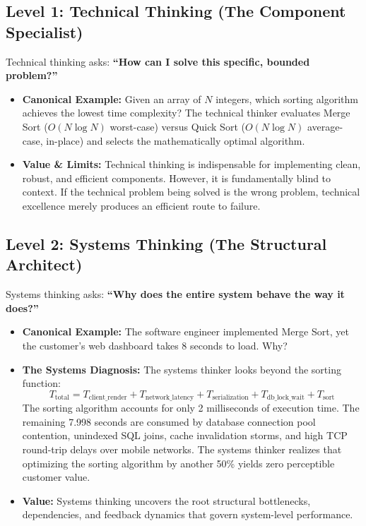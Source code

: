\subsection{Level 1: Technical Thinking (The Component Specialist)}
Technical thinking asks: \textbf{``How can I solve this specific, bounded problem?''}
\begin{itemize}[leftmargin=1.5em]
    \item \textbf{Canonical Example:} Given an array of $N$ integers, which sorting algorithm achieves the lowest time complexity? The technical thinker evaluates Merge Sort ($O(N \log N)$ worst-case) versus Quick Sort ($O(N \log N)$ average-case, in-place) and selects the mathematically optimal algorithm.
    \item \textbf{Value \& Limits:} Technical thinking is indispensable for implementing clean, robust, and efficient components. However, it is fundamentally blind to context. If the technical problem being solved is the wrong problem, technical excellence merely produces an efficient route to failure.
\end{itemize}

\subsection{Level 2: Systems Thinking (The Structural Architect)}
Systems thinking asks: \textbf{``Why does the entire system behave the way it does?''}
\begin{itemize}[leftmargin=1.5em]
    \item \textbf{Canonical Example:} The software engineer implemented Merge Sort, yet the customer's web dashboard takes 8 seconds to load. Why?
    \item \textbf{The Systems Diagnosis:} The systems thinker looks beyond the sorting function:
    \begin{equation}
        T_{\text{total}} = T_{\text{client\_render}} + T_{\text{network\_latency}} + T_{\text{serialization}} + T_{\text{db\_lock\_wait}} + T_{\text{sort}}
    \end{equation}
    The sorting algorithm accounts for only 2 milliseconds of execution time. The remaining 7.998 seconds are consumed by database connection pool contention, unindexed SQL joins, cache invalidation storms, and high TCP round-trip delays over mobile networks. The systems thinker realizes that optimizing the sorting algorithm by another 50\% yields zero perceptible customer value.
    \item \textbf{Value:} Systems thinking uncovers the root structural bottlenecks, dependencies, and feedback dynamics that govern system-level performance.
\end{itemize}

